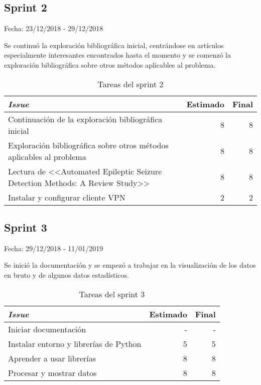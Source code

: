 \subsection{Sprint 2}

Fecha: 23/12/2018 - 29/12/2018

Se continuó la exploración bibliográfica inicial, centrándose en artículos especialmente interesantes encontrados hasta el momento y se comenzó la exploración bibliográfica sobre otros métodos aplicables al problema. 

\begin{table}[H]
	\begin{tabularx}{\textwidth}{Xrr}
		\toprule \textbf{\textit{Issue}} & \textbf{Estimado} & \textbf{Final}\\
		\toprule
		Continuación de la exploración bibliográfica inicial & 8 & 8 \\
		Exploración bibliográfica sobre otros métodos aplicables al problema & 8 & 8 \\
		Lectura de <<Automated Epileptic Seizure Detection Methods: A Review Study>> & 8 & 8 \\
		Instalar y configurar cliente VPN & 2 & 2 \\
		\bottomrule
	\end{tabularx}
	\caption{Tareas del sprint 2}
\end{table}

\subsection{Sprint 3}

Fecha: 29/12/2018 - 11/01/2019

Se inició la documentación y se empezó a trabajar en la visualización de los datos en bruto y de algunos datos estadísticos.

\begin{table}[H]
	\begin{tabularx}{\textwidth}{Xrr}
		\toprule \textbf{\textit{Issue}} & \textbf{Estimado} & \textbf{Final}\\
		\toprule 
		Iniciar documentación & - & - \\
		Instalar entorno y librerías de Python & 5 & 5 \\
		Aprender a usar librerías & 8 & 8 \\
		Procesar y mostrar datos & 8 & 8 \\
		\bottomrule
	\end{tabularx}
	\caption{Tareas del sprint 3}
\end{table}

